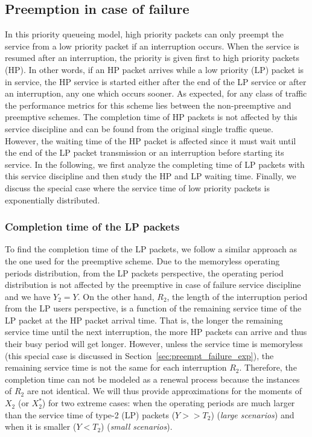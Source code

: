 \documentclass[11pt,journal,oneside,onecolumn,draftclsnofoot]{IEEEtran}
\begin{document}
\subsection{{Preemption in case of failure}}
\label{sec:preempt_failure}

In this priority queueing model, high priority packets can only preempt the service from a low priority packet if an interruption occurs. When the service is resumed after an interruption, the priority is given first to high priority packets (HP). In other words, if an HP packet arrives while a low priority (LP) packet is in service, the HP service is started either after the end of the LP service or after an interruption, any one which occurs sooner. As expected, for any class of traffic the performance metrics for this scheme lies between the non-preemptive and preemptive schemes.  
The completion time of HP packets is not affected by this service discipline and can be found from the original single traffic queue. However, the waiting time of the HP packet is affected since it must wait until the end of the LP packet transmission or an interruption before starting its service. In the following, we first analyze the completing time of LP packets with this service discipline and then study the HP and LP waiting time. Finally, we discuss the special case where the service time of low priority packets is exponentially distributed. 

\subsubsection{Completion time of the LP packets} 
To find the completion time of the LP packets, we follow a similar approach as the one used for the preemptive scheme. Due to the memoryless operating periods distribution, from the LP packets perspective, the operating period distribution is not affected by the preemptive in case of failure service discipline and we have $Y_2=Y$. On the other hand, 
$R_2$, the length of the interruption period from the LP users perspective, is a function of the remaining service time of the LP packet at the HP packet arrival time. That is, the longer the remaining service time until the next interruption, the more HP packets can arrive and thus their busy period will get longer. However, unless the service time is memoryless (this special case is discussed in Section~\ref{sec:preempt_failure_exp}), the remaining service time is not the same for each interruption $R_2$. Therefore, the completion time can not be modeled as a renewal process because the instances of $R_2$ are not identical. 
We will thus provide approximations for the moments of $X_2$ (or $X^*_2$) for two extreme cases: when the operating periods are much larger than the service time of type-2 (LP) packets ($Y >> T_2$) (\emph{large scenarios}) and when it is smaller ($Y < T_2$) (\emph{small scenarios}).  
\end{document}
